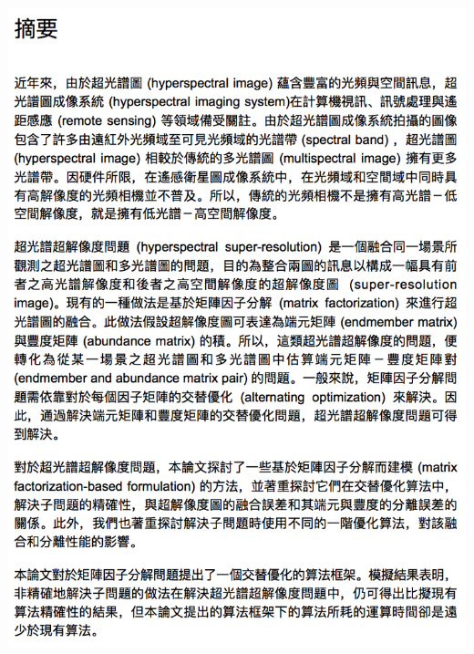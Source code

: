 \documentclass[a4paper, 11pt, oneside]{Thesis}
\begin{document}
\clearpage
\begin{centering}
\includegraphics[width=0.98\linewidth]{./fig/abstract_chi/Abstract_chi}
\end{centering}

\clearpage                        %

\end{document}
